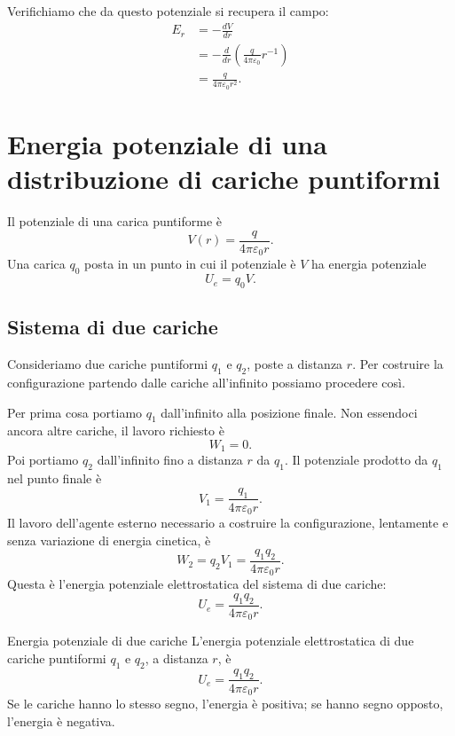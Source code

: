 \documentclass[a4paper]{article}
\begin{document}
Verifichiamo che da questo potenziale si recupera il campo:
\begin{align*}
    E_r
    &=-\frac{dV}{dr} \\
    &=-\frac{d}{dr}\left(\frac{q}{4\pi\varepsilon_0}r^{-1}\right) \\
    &=\frac{q}{4\pi\varepsilon_0r^2}.
\end{align*}

\section{Energia potenziale di una distribuzione di cariche puntiformi}

Il potenziale di una carica puntiforme è
\[
    V(r)=\frac{q}{4\pi\varepsilon_0r}.
\]
Una carica \(q_0\) posta in un punto in cui il potenziale è \(V\) ha energia potenziale
\[
    U_e=q_0V.
\]

\subsection{Sistema di due cariche}

Consideriamo due cariche puntiformi \(q_1\) e \(q_2\), poste a distanza \(r\). Per costruire la configurazione partendo dalle cariche all'infinito possiamo procedere così.

Per prima cosa portiamo \(q_1\) dall'infinito alla posizione finale. Non essendoci ancora altre cariche, il lavoro richiesto è
\[
    W_1=0.
\]
Poi portiamo \(q_2\) dall'infinito fino a distanza \(r\) da \(q_1\). Il potenziale prodotto da \(q_1\) nel punto finale è
\[
    V_1=\frac{q_1}{4\pi\varepsilon_0r}.
\]
Il lavoro dell'agente esterno necessario a costruire la configurazione, lentamente e senza variazione di energia cinetica, è
\[
    W_2=q_2V_1=\frac{q_1q_2}{4\pi\varepsilon_0r}.
\]
Questa è l'energia potenziale elettrostatica del sistema di due cariche:
\[
    U_e=\frac{q_1q_2}{4\pi\varepsilon_0r}.
\]

\begin{snippetproposition}{Energia potenziale di due cariche}
    L'energia potenziale elettrostatica di due cariche puntiformi \(q_1\) e \(q_2\), a distanza \(r\), è
    \[
        U_e=\frac{q_1q_2}{4\pi\varepsilon_0r}.
    \]
    Se le cariche hanno lo stesso segno, l'energia è positiva; se hanno segno opposto, l'energia è negativa.
\end{snippetproposition}

\begin{center}
\end{center}
\end{document}
